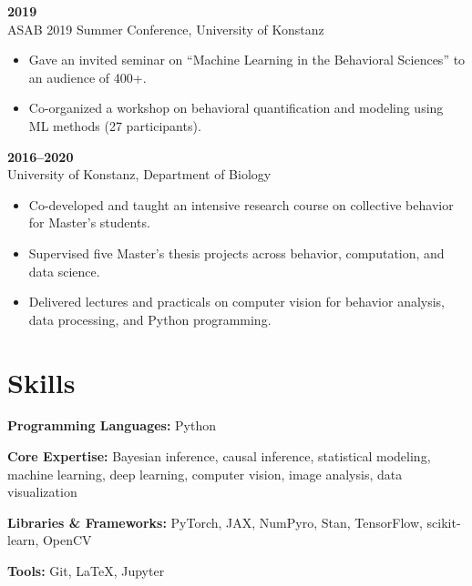 \documentclass[10pt,letterpaper]{article}
\begin{document}
	\vspace{4pt}
	\textbf{2019}\\
	ASAB 2019 Summer Conference, University of Konstanz
	\begin{itemize}
		\item Gave an invited seminar on “Machine Learning in the Behavioral Sciences” to an audience of 400+.
		\item Co-organized a workshop on behavioral quantification and modeling using ML methods (27 participants).
	\end{itemize}
	
	\vspace{4pt}
	\textbf{2016--2020}\\
	University of Konstanz, Department of Biology
	\begin{itemize}
		\item Co-developed and taught an intensive research course on collective behavior for Master’s students.
		\item Supervised five Master’s thesis projects across behavior, computation, and data science.
		\item Delivered lectures and practicals on computer vision for behavior analysis, data processing, and Python programming.
	\end{itemize}
	
	\section*{Skills}
	\textbf{Programming Languages:} Python
	
	\textbf{Core Expertise:} Bayesian inference, causal inference, statistical modeling, machine learning, deep learning, computer vision, image analysis, data visualization
	
	\textbf{Libraries \& Frameworks:} PyTorch, JAX, NumPyro, Stan, TensorFlow, scikit-learn, OpenCV
	
	\textbf{Tools:} Git, LaTeX, Jupyter
	
	
\end{document}
